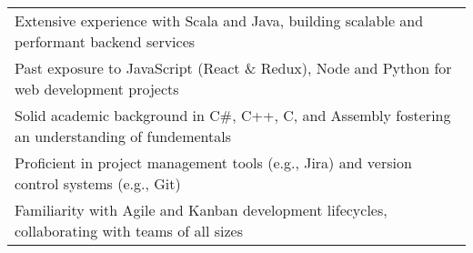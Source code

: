 \fontsize{11pt}{1.4em}\bodyfontlight\upshape\color{text}
\begin{tabular*}{\textwidth}{@{\hspace{4mm}\textbullet\hspace{2mm}} l @{\extracolsep{\fill}}}
    Extensive experience with Scala and Java, building scalable and performant backend services  \\
    Past exposure to JavaScript (React \& Redux), Node and Python for web development projects\\
    Solid academic background in C\#, C++, C, and Assembly fostering an understanding of fundementals\\
    Proficient in project management tools (e.g., Jira) and version control systems (e.g., Git) \\
    Familiarity with Agile and Kanban development lifecycles, collaborating with teams of all sizes
\end{tabular*}
